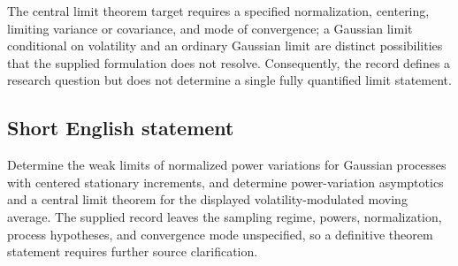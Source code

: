 \documentclass[11pt]{article}
\begin{document}
The central limit theorem target requires a specified normalization, centering, limiting variance or covariance, and mode of convergence; a Gaussian limit conditional on volatility and an ordinary Gaussian limit are distinct possibilities that the supplied formulation does not resolve. Consequently, the record defines a research question but does not determine a single fully quantified limit statement.
\subsection{Short English statement}
Determine the weak limits of normalized power variations for Gaussian processes with centered stationary increments, and determine power-variation asymptotics and a central limit theorem for the displayed volatility-modulated moving average. The supplied record leaves the sampling regime, powers, normalization, process hypotheses, and convergence mode unspecified, so a definitive theorem statement requires further source clarification.
\end{document}
